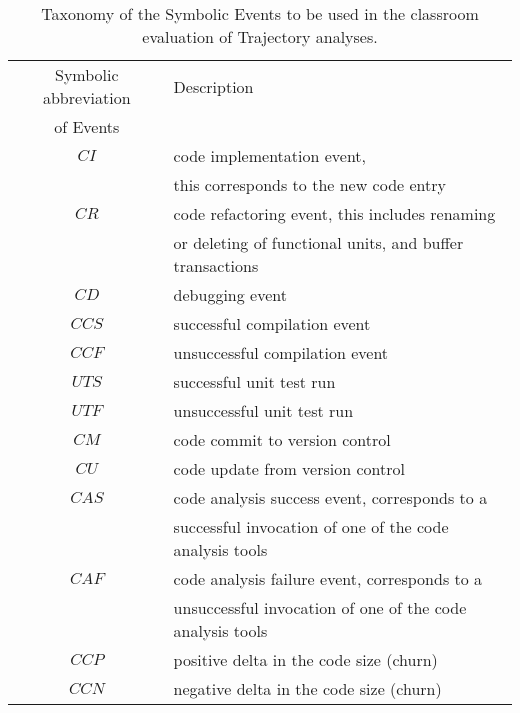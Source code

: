 \begin{table}
\begin{center}
    \begin{tabular}{ | c | l | }
    \hline
    Symbolic abbreviation & Description \\ 
     of Events 						& 	  \\ 
    \hline
    $CI$                  & code implementation event, \\
    											& this corresponds to the new code entry \\
    \hline    											
    $CR$                  & code refactoring event, this includes renaming \\
    											& or deleting of functional units, and buffer transactions \\
    \hline
    $CD$                  & debugging event \\
		\hline
		$CCS$                 & successful compilation event \\
		\hline
		$CCF$                 & unsuccessful compilation event \\
    \hline
		$UTS$                 & successful unit test run \\
		\hline
		$UTF$                 & unsuccessful unit test run \\
		\hline
		$CM$                  & code commit to version control \\
		\hline
		$CU$                  & code update from version control \\
		\hline
    $CAS$                 & code analysis success event, corresponds to a \\
                          & successful invocation of one of the code analysis tools \\
    \hline
		$CAF$                 & code analysis failure event, corresponds to a \\
                          & unsuccessful invocation of one of the code analysis tools \\
    \hline    
    $CCP$                 & positive delta in the code size (churn) \\
    \hline
    $CCN$                 & negative delta in the code size (churn) \\
    \hline
    \end{tabular}
    \caption{Taxonomy of the Symbolic Events to be used in the classroom evaluation of Trajectory analyses.}
    \label{fig:data_collected_points}
    \end{center}
\end{table}


